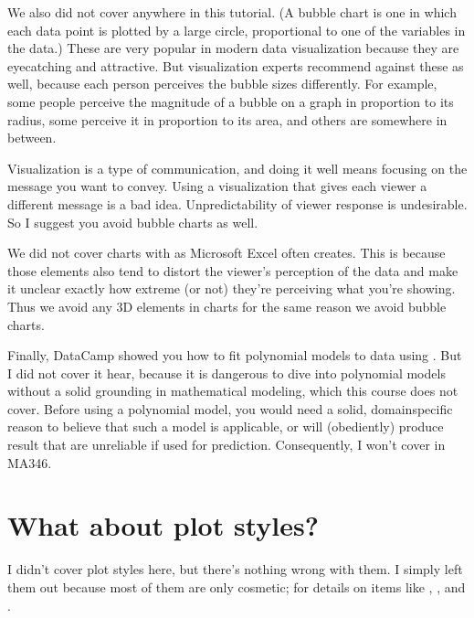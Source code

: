 \documentclass[letterpaper,10pt,english]{sphinxmanual}
\begin{document}
We also did not cover  anywhere in this tutorial.  (A bubble chart is one in which each data point is plotted by a large circle, proportional to one of the variables in the data.)  These are very popular in modern data visualization because they are eye\sphinxhyphen{}catching and attractive.  But visualization experts recommend against these as well, because each person perceives the bubble sizes differently.  For example, some people perceive the magnitude of a bubble on a graph in proportion to its radius, some perceive it in proportion to its area, and others are somewhere in between.

Visualization is a type of communication, and doing it well means focusing on the message you want to convey.  Using a visualization that gives each viewer a different message is a bad idea.  Unpredictability of viewer response is undesirable.  So I suggest you avoid bubble charts as well.

We did not cover charts with  as Microsoft Excel often creates.  This is because those elements also tend to distort the viewer’s perception of the data and make it unclear exactly how extreme (or not) they’re perceiving what you’re showing.  Thus we avoid any 3D elements in charts for the same reason we avoid bubble charts.

Finally, DataCamp showed you how to fit polynomial models to data using .  But I did not cover it hear, because it is dangerous to dive into polynomial models without a solid grounding in mathematical modeling, which this course does not cover.  Before using a polynomial model, you would need a solid, domain\sphinxhyphen{}specific reason to believe that such a model is applicable, or  will (obediently) produce result that are unreliable if used for prediction.  Consequently, I won’t cover  in MA346.


\section{What about plot styles?}
\label{\detokenize{chapter-10-visualization:what-about-plot-styles}}
I didn’t cover plot styles here, but there’s nothing wrong with them.  I simply left them out because most of them are only cosmetic;  for details on items like , , and .
\end{document}
